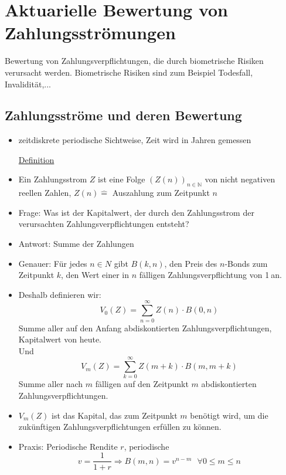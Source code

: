 \newpage
\section{Aktuarielle Bewertung von Zahlungsströmungen}
\label{sec:zahlungsströmungen}
 Bewertung von Zahlungsverpflichtungen, die durch biometrische Risiken verursacht werden. 
Biometrische Risiken sind zum Beispiel Todesfall, Invalidität,...\\
\subsection{Zahlungsströme und deren Bewertung}
\label{sub:zahlungsströme}
\begin{itemize}
	\item zeitdiskrete periodische Sichtweise, Zeit wird in Jahren gemessen
	\item[\uline{Definition}]
	\item Ein Zahlungsstrom $Z$ ist eine Folge $(Z(n))_{n \in \mathds{N}}$ von nicht negativen reellen Zahlen, $Z(n) \mathrel{\hat=}$ Auszahlung zum Zeitpunkt $n$
	\item Frage: Was ist der Kapitalwert, der durch den Zahlungsstrom der verursachten Zahlungsverpflichtungen entsteht?
	\item Antwort: Summe der  Zahlungen
	\item Genauer: Für jedes $n\in N$ gibt $B(k,n)$, den Preis des $n$-Bonds zum Zeitpunkt $k$, den Wert einer in $n$ fälligen Zahlungsverpflichtung von 1\texteuro$~$an.
	\item Deshalb definieren wir:\\
	\[
	V_0(Z)= \sum_{n=0}^{\infty}Z(n)\cdot B(0,n) 
	\]
	Summe aller auf den Anfang abdiskontierten Zahlungsverpflichtungen, Kapitalwert von heute.\\Und
	\[
	V_m(Z)= \sum_{k=0}^{\infty}Z(m+k)\cdot B(m,m+k) 
	\]
	Summe aller nach $m$ fälligen auf den Zeitpunkt $m$ abdiskontierten Zahlungsverpflichtungen.
	\item $V_m(Z)$ ist das Kapital, das zum Zeitpunkt $m$ benötigt wird, um die zukünftigen Zahlungsverpflichtungen erfüllen zu können.
	\item Praxis: Periodische Rendite $r$, periodische 
	\[
	v=\frac{1}{1+r} \Rightarrow B(m,n)=v^{n-m}~~~\forall 0\le m\le n 
	\]
\end{itemize}

